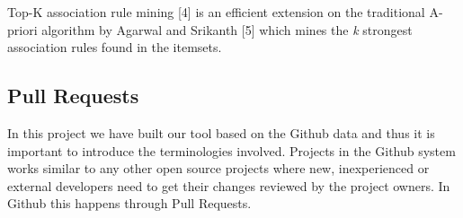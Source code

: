 \begin{table}[htbp]
  \centering
  \caption{}
  \hspace{1cm}
\end{table}


Top-K association rule mining [4] is an efficient extension on the traditional A-priori algorithm by Agarwal and Srikanth [5] which mines the \textit{k} strongest association rules found in the itemsets.


\subsection{Pull Requests}

In this project we have built our tool based on the Github data and thus it is important to introduce the terminologies involved. Projects in the Github system works similar to any other open source projects where new, inexperienced or external developers need to get their changes reviewed by the project owners. In Github this happens through Pull Requests.\\

